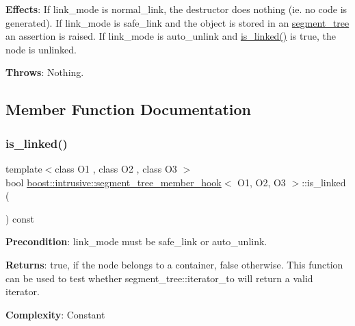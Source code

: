 {\bfseries Effects}\+: If link\+\_\+mode is {\ttfamily normal\+\_\+link}, the destructor does nothing (ie. no code is generated). If link\+\_\+mode is {\ttfamily safe\+\_\+link} and the object is stored in an \hyperlink{classboost_1_1intrusive_1_1segment__tree}{segment\+\_\+tree} an assertion is raised. If link\+\_\+mode is {\ttfamily auto\+\_\+unlink} and {\ttfamily \hyperlink{classboost_1_1intrusive_1_1segment__tree__member__hook_ad0724b6dcff7e71fde0365fc04ceaca3}{is\+\_\+linked()}} is true, the node is unlinked.

{\bfseries Throws}\+: Nothing. 

\subsection{Member Function Documentation}
\mbox{\label{classboost_1_1intrusive_1_1segment__tree__member__hook_ad0724b6dcff7e71fde0365fc04ceaca3}} 
\subsubsection{\texorpdfstring{is\+\_\+linked()}{is\_linked()}}
{\footnotesize\ttfamily template$<$class O1 , class O2 , class O3 $>$ \\
bool \hyperlink{classboost_1_1intrusive_1_1segment__tree__member__hook}{boost\+::intrusive\+::segment\+\_\+tree\+\_\+member\+\_\+hook}$<$ O1, O2, O3 $>$\+::is\+\_\+linked (\begin{DoxyParamCaption}{ }\end{DoxyParamCaption}) const}

{\bfseries Precondition}\+: link\+\_\+mode must be {\ttfamily safe\+\_\+link} or {\ttfamily auto\+\_\+unlink}.

{\bfseries Returns}\+: true, if the node belongs to a container, false otherwise. This function can be used to test whether {\ttfamily segment\+\_\+tree\+::iterator\+\_\+to} will return a valid iterator.

{\bfseries Complexity}\+: Constant \mbox{\label{classboost_1_1intrusive_1_1segment__tree__member__hook_a318a273a207a6eb05882649e986b403e}} 
